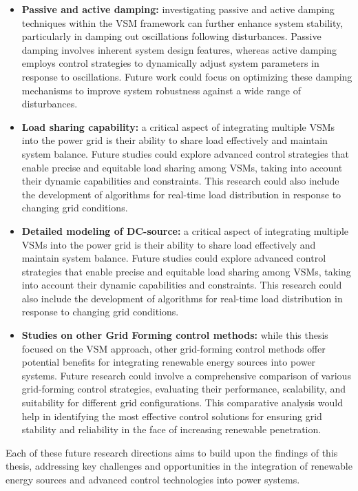 \begin{itemize}
    \item \textbf{Passive and active damping:} investigating passive and active
    damping techniques within the VSM framework can further enhance system
    stability, particularly in damping out oscillations following disturbances.
    Passive damping involves inherent system design features, whereas active
    damping employs control strategies to dynamically adjust system parameters
    in response to oscillations. Future work could focus on optimizing these
    damping mechanisms to improve system robustness against a wide range of
    disturbances.
    \item \textbf{Load sharing capability:} a critical aspect of integrating
    multiple VSMs into the power grid is their ability to share load effectively
    and maintain system balance. Future studies could explore advanced control
    strategies that enable precise and equitable load sharing among VSMs, taking
    into account their dynamic capabilities and constraints. This research could
    also include the development of algorithms for real-time load distribution
    in response to changing grid conditions.
    \item \textbf{Detailed modeling of DC-source:} a critical aspect of
    integrating multiple VSMs into the power grid is their ability to share load
    effectively and maintain system balance. Future studies could explore
    advanced control strategies that enable precise and equitable load sharing
    among VSMs, taking into account their dynamic capabilities and constraints.
    This research could also include the development of algorithms for real-time
    load distribution in response to changing grid conditions.
    \item \textbf{Studies on other Grid Forming control methods:} while this
    thesis focused on the VSM approach, other grid-forming control methods offer
    potential benefits for integrating renewable energy sources into power
    systems. Future research could involve a comprehensive comparison of various
    grid-forming control strategies, evaluating their performance, scalability,
    and suitability for different grid configurations. This comparative analysis
    would help in identifying the most effective control solutions for ensuring
    grid stability and reliability in the face of increasing renewable
    penetration.
\end{itemize}

Each of these future research directions aims to build upon the findings of this
thesis, addressing key challenges and opportunities in the integration of
renewable energy sources and advanced control technologies into power systems.




